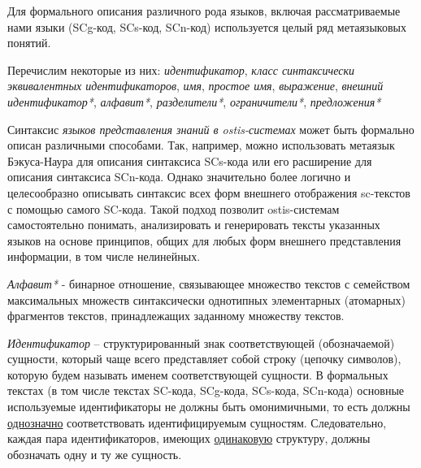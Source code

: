 Для формального описания различного рода языков, включая рассматриваемые нами языки (SCg-код, SCs-код, SCn-код) используется целый ряд метаязыковых понятий.

Перечислим некоторые из них: \textit{идентификатор}, \textit{класс синтаксически эквивалентных идентификаторов}, \textit{имя}, \textit{простое имя}, \textit{выражение}, \textit{внешний идентификатор*}, \textit{алфавит*}, \textit{разделители*}, \textit{ограничители*}, \textit{предложения*}

Синтаксис \textit{языков представления знаний в ostis-системах} может быть формально описан различными способами.
Так, например, можно использовать метаязык Бэкуса-Наура для описания синтаксиса SCs-кода или его расширение для описания синтаксиса SCn-кода.
Однако значительно более логично и целесообразно описывать синтаксис всех форм внешнего отображения sc-текстов с помощью самого SC-кода.
Такой подход позволит ostis-системам самостоятельно понимать, анализировать и генерировать тексты указанных языков на основе принципов, общих для любых форм внешнего представления информации, в том числе нелинейных.

\textit{Алфавит*} - бинарное отношение, связывающее множество текстов с  семейством максимальных множеств синтаксически однотипных элементарных (атомарных) фрагментов текстов, принадлежащих заданному множеству текстов.



\textit{Идентификатор} -- структурированный знак соответствующей (обозначаемой) сущности, который чаще всего представляет собой строку (цепочку символов), которую будем называть именем соответствующей сущности.
В формальных текстах (в том числе текстах SC-кода, SCg-кода, SCs-кода, SCn-кода) основные используемые идентификаторы не должны быть омонимичными, то есть должны \underline{однозначно} соответствовать идентифицируемым сущностям.
Следовательно, каждая пара идентификаторов, имеющих \underline{одинаковую} структуру, должны обозначать одну и ту же сущность.


